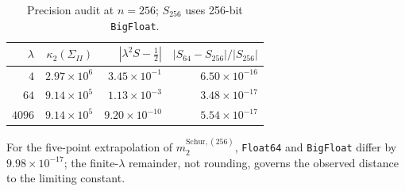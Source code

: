 \documentclass[11pt]{article}
\begin{document}
\begin{table}[htbp]
  \centering
  \caption{Precision audit at $n=256$; $S_{256}$ uses 256-bit
  \texttt{BigFloat}.}
  \label{tab:supp_precision_audit}
  \begin{tabular}{rrrr}
    \toprule
    $\lambda$ & $\kappa_2(\Sigma_{II})$ &
    $|\lambda^2S-\tfrac12|$ &
    $|S_{64}-S_{256}|/|S_{256}|$ \\
    \midrule
    $4$ & $2.97\times10^6$ & $3.45\times10^{-1}$ & $6.50\times10^{-16}$ \\
    $64$ & $9.14\times10^5$ & $1.13\times10^{-3}$ & $3.48\times10^{-17}$ \\
    $4096$ & $9.14\times10^5$ & $9.20\times10^{-10}$ & $5.54\times10^{-17}$ \\
    \bottomrule
  \end{tabular}
\end{table}

For the five-point extrapolation of $m_2^{\mathrm{Schur},(256)}$,
\texttt{Float64} and \texttt{BigFloat} differ by $9.98\times10^{-17}$; the
finite-$\lambda$ remainder, not rounding, governs the observed distance to the
limiting constant.
\end{document}
